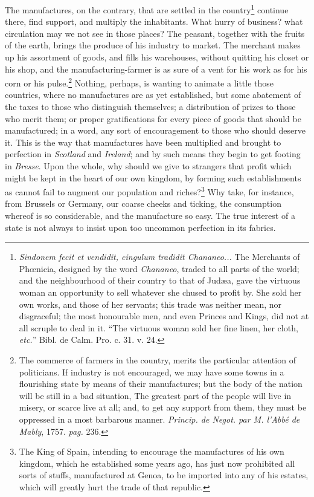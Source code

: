 \documentclass[a4paper, 11pt, oneside, polutonikogreek, english]{article}
\begin{document}
The manufactures, on the contrary, that are settled in the country\footnote{\emph{Sindonem fecit et vendidit, cingulum tradidit Chananeo...} The Merchants of Phœnicia, designed by the word \emph{Chananeo}, traded to all parts of the world; and the neighbourhood of their country to that of Judæa, gave the virtuous woman an opportunity to sell whatever she chused to profit by. She sold her own works, and those of her servants; this trade was neither mean, nor disgraceful; the most honourable men, and even Princes and Kings, did not at all scruple to deal in it. ``The virtuous woman sold her fine linen, her cloth, \emph{etc.}'' Bibl. de Calm. Pro. c. 31. v. 24.} continue there, find support, and multiply the inhabitants. What hurry of business? what circulation may we not see in those places? The peasant, together with the fruits of the earth, brings the produce of his industry to market. The merchant makes up his assortment of goods, and fills his warehouses, without quitting his closet or his shop, and the manufacturing-farmer is as sure of a vent for his work as for his corn or his pulse.\footnote{The commerce of farmers in the country, merits the particular attention of politicians. If industry is not encouraged, we may have some towns in a flourishing state by means of their manufactures; but the body of the nation will be still in a bad situation, The greatest part of the people will live in misery, or scarce live at all; and, to get any support from them, they must be oppressed in a most barbarous manner. \emph{Princip. de Negot. par M. l'Abbé de Mably}, 1757. \emph{pag.} 236.} Nothing, perhaps, is wanting to animate a little those countries, where no manufactures are as yet established, but some abatement of the taxes to those who distinguish themselves; a distribution of prizes to those who merit them; or proper gratifications for every piece of goods that should be manufactured; in a word, any sort of encouragement to those who should deserve it. This is the way that manufactures have been multiplied and brought to perfection in \emph{Scotland} and \emph{Ireland}; and by such means they begin to get footing in \emph{Bresse}. Upon the whole, why should we give to strangers that profit which might be kept in the heart of our own kingdom, by forming such establishments as cannot fail to augment our population and riches?\footnote{The King of Spain, intending to encourage the manufactures of his own kingdom, which he established some years ago, has just now prohibited all sorts of stuffs, manufactured at Genoa, to be imported into any of his estates, which will greatly hurt the trade of that republic.} Why take, for instance, from Brussels or Germany, our coarse cheeks and ticking, the consumption whereof is so considerable, and the manufacture so easy. The true interest of a state is not always to insist upon too uncommon perfection in its fabrics.
\end{document}

